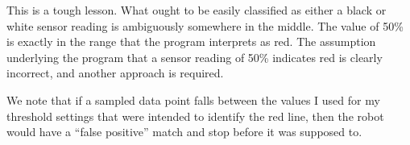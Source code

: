 \documentclass[letterpaper,10pt,english]{sphinxmanual}
\begin{document}
This is a tough lesson. What ought to be easily classified as either a black or white sensor reading is ambiguously somewhere in the middle. The value of 50\% is exactly in the range that the program interprets as red. The assumption underlying the program that a sensor reading of 50\% indicates red is clearly incorrect, and another approach is required.

We note that if a sampled data point falls between the values I used for my threshold settings that were intended to identify the red line, then the robot would have a “false positive” match and stop before it was supposed to.



\renewcommand{\indexname}{Index}
\printindex
\end{document}
